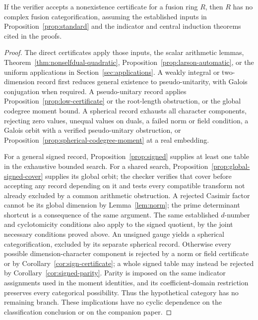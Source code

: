\begin{proposition}\label{prop:certificate-sound}
If the verifier accepts a nonexistence certificate for a fusion ring $R$,
then $R$ has no complex fusion categorification, assuming the established
inputs in Proposition~\ref{prop:standard} and the indicator and central
induction theorems cited in the proofs.
\end{proposition}
\begin{proof}
The direct certificates apply those inputs, the scalar arithmetic lemmas,
Theorem~\ref{thm:nonselfdual-quadratic}, Proposition~\ref{prop:larson-automatic},
or the uniform applications in
Section~\ref{sec:applications}. A weakly integral or two-dimension record
first reduces general existence to pseudo-unitarity, with Galois conjugation
when required. A pseudo-unitary record
applies Proposition~\ref{prop:low-certificate} or the root-length
obstruction, or the global codegree moment bound. A spherical record exhausts all character components,
rejecting zero values, unequal values on duals, a failed norm or field
condition, a Galois orbit with a verified pseudo-unitary obstruction, or
Proposition~\ref{prop:spherical-codegree-moment} at a real embedding.

For a general signed record, Proposition~\ref{prop:signed} supplies at
least one table in the exhaustive bounded search. For a shared search,
Proposition~\ref{prop:global-signed-cover} supplies its global orbit;
the checker verifies that cover before accepting any record depending on
it and tests every compatible transform not already excluded by a common
arithmetic obstruction. A rejected Casimir
factor cannot be its global dimension by Lemma~\ref{lem:norm}; the
prime determinant shortcut is a consequence of the same argument.
The same established $d$-number and cyclotomicity conditions also apply
to the signed quotient, by the joint necessary conditions proved above.
An unsigned gauge yields a spherical categorification, excluded by its
separate spherical record. Otherwise every possible dimension-character
component is rejected by a norm or field certificate or by
Corollary~\ref{cor:sign-certificate}; a whole signed table may instead
be rejected by Corollary~\ref{cor:signed-parity}. Parity is imposed
on the same indicator assignments used in the moment identities, and its
coefficient-domain restriction preserves every categorical possibility.
Thus the hypothetical category has
no remaining branch. These implications have no cyclic dependence on
the classification conclusion or on the companion paper.
\end{proof}

